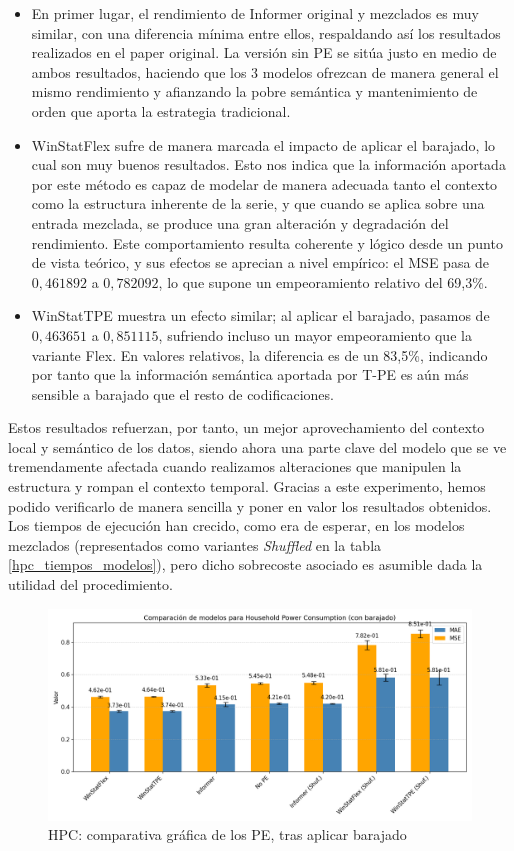 \begin{itemize}
	\item En primer lugar, el rendimiento de Informer original y mezclados es muy similar, con una diferencia mínima entre ellos, respaldando así los resultados realizados en el paper original. La versión sin PE se sitúa justo en medio de ambos resultados, haciendo que los 3 modelos ofrezcan de manera general el mismo rendimiento y afianzando la pobre semántica y mantenimiento de orden que aporta la estrategia tradicional.
	\item WinStatFlex sufre de manera marcada el impacto de aplicar el barajado, lo cual son muy buenos resultados. Esto nos indica que la información aportada por este método es capaz de modelar de manera adecuada tanto el contexto como la estructura inherente de la serie, y que cuando se aplica sobre una entrada mezclada, se produce una gran alteración y degradación del rendimiento. Este comportamiento resulta coherente y lógico desde un punto de vista teórico, y sus efectos se aprecian a nivel empírico: el MSE pasa de $0,461892$ a $0,782092$, lo que supone un empeoramiento relativo del 69,3\%.
	\item WinStatTPE muestra un efecto similar; al aplicar el barajado, pasamos de $0,463651$ a $0,851115$, sufriendo incluso un mayor empeoramiento que la variante Flex. En valores relativos, la diferencia es de un 83,5\%, indicando por tanto que la información semántica aportada por T-PE es aún más sensible a barajado que el resto de codificaciones.
\end{itemize}

Estos resultados refuerzan, por tanto, un mejor aprovechamiento del contexto local y semántico de los datos, siendo ahora una parte clave del modelo que se ve tremendamente afectada cuando realizamos alteraciones que manipulen la estructura y rompan el contexto temporal. Gracias a este experimento, hemos podido verificarlo de manera sencilla y poner en valor los resultados obtenidos. Los tiempos de ejecución han crecido, como era de esperar, en los modelos mezclados (representados como variantes \textit{Shuffled} en la tabla \ref{hpc_tiempos_modelos}), pero dicho sobrecoste asociado es asumible dada la utilidad del procedimiento.\\

\begin{figure}[!ht]
	\centering
	\includegraphics[scale=0.475]{img/hpcgraphshuffled}
	\caption{HPC: comparativa gráfica de los PE, tras aplicar barajado}
	\label{hpcgraphshuffled}
\end{figure}

